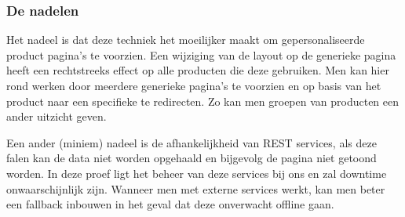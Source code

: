 	\subsubsection{De nadelen}
    Het nadeel is dat deze techniek het moeilijker maakt om gepersonaliseerde product pagina's te voorzien. Een wijziging van de layout op de generieke pagina heeft een rechtstreeks effect op alle producten die deze gebruiken. Men kan hier rond werken door meerdere generieke pagina's te voorzien en op basis van het product naar een specifieke te redirecten. Zo kan men groepen van producten een ander uitzicht geven.
    \par
    Een ander (miniem) nadeel is de afhankelijkheid van REST services, als deze falen kan de data niet worden opgehaald en bijgevolg de pagina niet getoond worden. In deze proef ligt het beheer van deze services bij ons en zal downtime onwaarschijnlijk zijn. Wanneer men met externe services werkt, kan men beter een fallback inbouwen in het geval dat deze onverwacht offline gaan.
